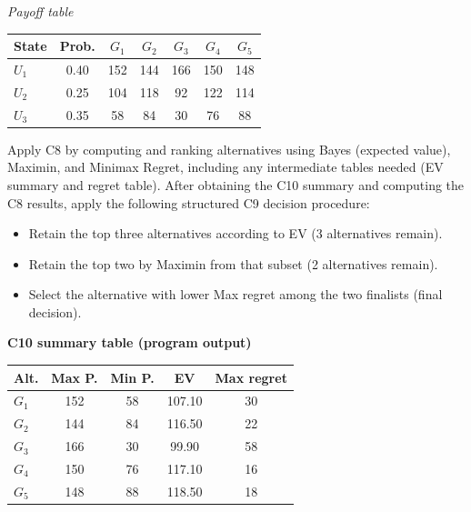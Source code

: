 \begin{ExamProblems}
		\begin{center}
			\textit{Payoff table} \\
			\begin{tabular}{l c c c c c c}
				\hline
				State& Prob. & $G_1$ & $G_2$ & $G_3$ & $G_4$ & $G_5$ \\
				\hline
				$U_1$ & 0.40 & 152 & 144 & 166 & 150 & 148 \\
				$U_2$ & 0.25 & 104 & 118 & 92 & 122 & 114 \\
				$U_3$ & 0.35 & 58 & 84 & 30 & 76 & 88 \\
				\hline
			\end{tabular}
		\end{center}
		
		Apply C8 by computing and ranking alternatives using Bayes (expected value), Maximin, and Minimax Regret, including any intermediate tables needed (EV summary and regret table).
		After obtaining the C10 summary and computing the C8 results, apply the following structured C9 decision procedure:
		\begin{itemize}
			\item Retain the top three alternatives according to EV (3 alternatives remain).
			\item Retain the top two by Maximin from that subset (2 alternatives remain).
			\item Select the alternative with lower Max regret among the two finalists (final decision).
		\end{itemize}
		
		\vspace{0.25cm}
		
		\textbf{C10 summary table (program output)}\par
		\begin{center}
			\begin{tabular}{l c c c c}
				\hline
				Alt. & Max P. & Min P. & EV & Max regret \\
				\hline
				$G_1$ & 152 & 58 & 107.10 & 30 \\
				$G_2$ & 144 & 84 & 116.50 & 22 \\
				$G_3$ & 166 & 30 & 99.90 & 58 \\
				$G_4$ & 150 & 76 & 117.10 & 16 \\
				$G_5$ & 148 & 88 & 118.50 & 18 \\
				\hline
			\end{tabular}
		\end{center}
		

\end{ExamProblems}
